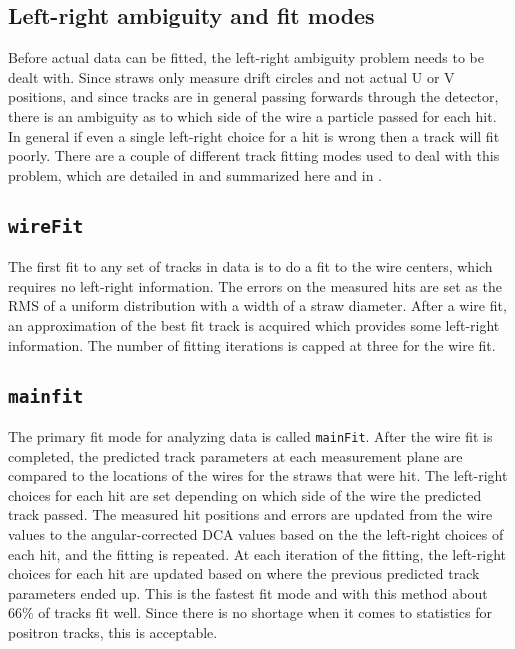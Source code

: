 \clearpage %


\subsection{Left-right ambiguity and fit modes}
\label{sub:leftright}


Before actual data can be fitted, the left-right ambiguity problem needs to be dealt with. Since straws only measure drift circles and not actual U or V positions, and since tracks are in general passing forwards through the detector, there is an ambiguity as to which side of the wire a particle passed for each hit. In general if even a single left-right choice for a hit is wrong then a track will fit poorly. There are a couple of different track fitting modes used to deal with this problem, which are detailed in  and summarized here and in .

\subsection*{\texttt{wireFit}}

The first fit to any set of tracks in data is to do a fit to the wire centers, which requires no left-right information. The errors on the measured hits are set as the RMS of a uniform distribution with a width of a straw diameter. After a wire fit, an approximation of the best fit track is acquired which provides some left-right information. The number of fitting iterations is capped at three for the wire fit.

\subsection*{\texttt{mainfit}}

The primary fit mode for analyzing data is called \texttt{mainFit}. After the wire fit is completed, the predicted track parameters at each measurement plane are compared to the locations of the wires for the straws that were hit. The left-right choices for each hit are set depending on which side of the wire the predicted track passed. The measured hit positions and errors are updated from the wire values to the angular-corrected DCA values based on the the left-right choices of each hit, and the fitting is repeated. At each iteration of the fitting, the left-right choices for each hit are updated based on where the previous predicted track parameters ended up. This is the fastest fit mode and with this method about 66\% of tracks fit well. Since there is no shortage when it comes to statistics for positron tracks, this is acceptable.


